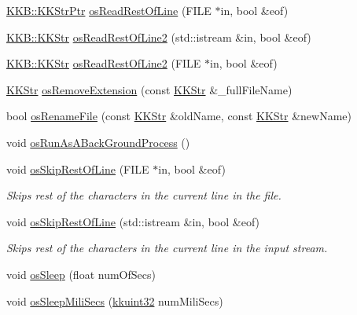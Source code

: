 \begin{DoxyCompactItemize}
\hyperlink{namespace_k_k_b_a9adbef5a6b3be0867f5570df2a08f388}{K\+K\+B\+::\+K\+K\+Str\+Ptr} \hyperlink{namespace_k_k_b_a1db90e2f4bc3414b8f7368eb4ac25844}{os\+Read\+Rest\+Of\+Line} (F\+I\+LE $\ast$in, bool \&eof)
\item 
\hyperlink{class_k_k_b_1_1_k_k_str}{K\+K\+B\+::\+K\+K\+Str} \hyperlink{namespace_k_k_b_a9358e2392d643851dace4e58faad0c8a}{os\+Read\+Rest\+Of\+Line2} (std\+::istream \&in, bool \&eof)
\item 
\hyperlink{class_k_k_b_1_1_k_k_str}{K\+K\+B\+::\+K\+K\+Str} \hyperlink{namespace_k_k_b_ab2c2417636cfb4cefbc28c3e41da9b74}{os\+Read\+Rest\+Of\+Line2} (F\+I\+LE $\ast$in, bool \&eof)
\item 
\hyperlink{class_k_k_b_1_1_k_k_str}{K\+K\+Str} \hyperlink{namespace_k_k_b_a13b1a6f4e074969602dbe4bf9022a9c6}{os\+Remove\+Extension} (const \hyperlink{class_k_k_b_1_1_k_k_str}{K\+K\+Str} \&\+\_\+full\+File\+Name)
\item 
bool \hyperlink{namespace_k_k_b_ad7ffe0f58106acc7aa54c2bdf149b463}{os\+Rename\+File} (const \hyperlink{class_k_k_b_1_1_k_k_str}{K\+K\+Str} \&old\+Name, const \hyperlink{class_k_k_b_1_1_k_k_str}{K\+K\+Str} \&new\+Name)
\item 
void \hyperlink{namespace_k_k_b_a9aa6d2cadbab47286374e7db0e73f8e3}{os\+Run\+As\+A\+Back\+Ground\+Process} ()
\item 
void \hyperlink{namespace_k_k_b_a9e8f1b4bf7babfb129d167e035623e44}{os\+Skip\+Rest\+Of\+Line} (F\+I\+LE $\ast$in, bool \&eof)
\begin{DoxyCompactList}\small\item\em Skips rest of the characters in the current line in the file. \end{DoxyCompactList}\item 
void \hyperlink{namespace_k_k_b_a8ec48375edc7bf877459fe577f7f0042}{os\+Skip\+Rest\+Of\+Line} (std\+::istream \&in, bool \&eof)
\begin{DoxyCompactList}\small\item\em Skips rest of the characters in the current line in the input stream. \end{DoxyCompactList}\item 
void \hyperlink{namespace_k_k_b_a1a3717b963b0813e96b66d1953fce1af}{os\+Sleep} (float num\+Of\+Secs)
\item 
void \hyperlink{namespace_k_k_b_a6d3dee6d4727244d65814aaade882c59}{os\+Sleep\+Mili\+Secs} (\hyperlink{namespace_k_k_b_af8d832f05c54994a1cce25bd5743e19a}{kkuint32} num\+Mili\+Secs)
\item 

\end{DoxyCompactItemize}
